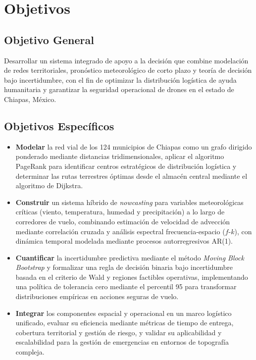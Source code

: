 \documentclass[
  spanish,
  us-letterpaper,
]{scrreprt}
\numberwithin{equation}{section}
\begin{document}

\chapter{Objetivos}\label{objetivos}

\section*{Objetivo General}\label{objetivo-general}


Desarrollar un sistema integrado de apoyo a la decisión que combine
modelación de redes territoriales, pronóstico meteorológico de corto
plazo y teoría de decisión bajo incertidumbre, con el fin de optimizar
la distribución logística de ayuda humanitaria y garantizar la seguridad
operacional de drones en el estado de Chiapas, México.

\section*{Objetivos Específicos}\label{objetivos-especuxedficos}


\begin{itemize}
\item
  \textbf{Modelar} la red vial de los 124 municipios de Chiapas como un
  grafo dirigido ponderado mediante distancias tridimensionales, aplicar
  el algoritmo PageRank para identificar centros estratégicos de
  distribución logística y determinar las rutas terrestres óptimas desde
  el almacén central mediante el algoritmo de Dijkstra.
\item
  \textbf{Construir} un sistema híbrido de \emph{nowcasting} para
  variables meteorológicas críticas (viento, temperatura, humedad y
  precipitación) a lo largo de corredores de vuelo, combinando
  estimación de velocidad de advección mediante correlación cruzada y
  análisis espectral frecuencia-espacio (\(f\)-\(k\)), con dinámica
  temporal modelada mediante procesos autorregresivos AR(1).
\item
  \textbf{Cuantificar} la incertidumbre predictiva mediante el método
  \emph{Moving Block Bootstrap} y formalizar una regla de decisión
  binaria bajo incertidumbre basada en el criterio de Wald y regiones
  factibles operativas, implementando una política de tolerancia cero
  mediante el percentil 95 para transformar distribuciones empíricas en
  acciones seguras de vuelo.
\item
  \textbf{Integrar} los componentes espacial y operacional en un marco
  logístico unificado, evaluar su eficiencia mediante métricas de tiempo
  de entrega, cobertura territorial y gestión de riesgo, y validar su
  aplicabilidad y escalabilidad para la gestión de emergencias en
  entornos de topografía compleja.
\end{itemize}
\end{document}
